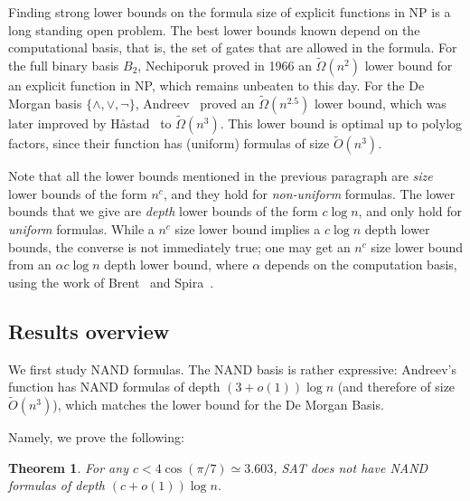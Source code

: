 \documentclass[a4paper, 11pt]{article}
\theoremstyle{plain}
\newtheorem{theorem}{Theorem}[section] %
\theoremstyle{definition}
\theoremstyle{remark}
\newcommand{\Omegat}[1]{\widetilde{\Omega}\left( #1 \right)}%
\newcommand{\Ot}[1]{\widetilde{O}\left( #1 \right)}%
\newcommand{\NP}{\textsf{NP}}%
\newcommand{\SAT}{\textsf{SAT}}%
\newcommand{\NAND}{\textsf{NAND}}%
\begin{document}
Finding strong lower bounds on the formula size of explicit functions in \NP{}
is a long standing open problem.
The best lower bounds known depend on the computational basis, that is, 
the set of gates that are allowed in the formula.
For the full binary basis $B_2$, Nechiporuk\cite{nechiporuk66boolean}
proved in 1966 an $\Omegat{n^2}$ lower bound for an explicit function in \NP{}, 
which remains unbeaten to this day.
For the De Morgan basis $\{\wedge, \vee, \neg\}$, Andreev~\cite{andreev1987method} 
proved an $\Omegat{n^{2.5}}$ lower bound, 
which was later improved by H{\aa}stad~\cite{hastad1998shrinkage} to $\Omegat{n^{3}}$.
This lower bound is optimal up to polylog factors,
since their function has (uniform) formulas of size $\Ot{n^{3}}$.

Note that all the lower bounds mentioned in the previous paragraph 
are \textit{size} lower bounds of the form $n^c$,
and they hold for \textit{non-uniform} formulas.  
The lower bounds that we give are \textit{depth} lower bounds of the form $c\log n$,
and only hold for \textit{uniform} formulas.
While a $n^c$ size lower bound implies a $c\log n$ depth lower bounds,
the converse is not immediately true; 
one may get an $n^c$ size lower bound from an
$\alpha c\log n$ depth lower bound, where $\alpha$ depends on the computation basis,
using the work of Brent~\cite{brent1974parallel} and Spira~\cite{spira1971time}.

\subsection{Results overview}

We first study \NAND{} formulas. 
The \NAND{} basis is rather expressive: Andreev's function has \NAND{} formulas of depth $(3+o(1)) \log n$ (and therefore of size $\Ot{n^3}$), which matches the lower bound for the De Morgan Basis.


Namely, we prove the following:
\begin{theorem}
	For any $c < 4 \cos(\pi/7) \simeq 3.603$, \SAT{} does not have \NAND{} formulas of depth $(c + o(1)) \log n$.
\end{theorem}
\end{document}
